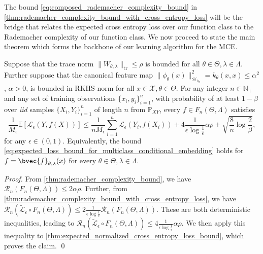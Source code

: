 \documentclass[runningheads, envcountsame, a4paper]{llncs}
\begin{document}
			The bound \eqref{eq:composed_rademacher_complexity_bound} in \cref{thm:rademacher_complexity_bound_with_cross_entropy_loss} will be the bridge that relates the expected cross entropy loss over our function class to the Rademacher complexity of our function class. We now proceed to state the main theorem which forms the backbone of our learning algorithm for the \gls{MCE}.
			
			\begin{lemma}
				\label{thm:expected_loss_bound_for_multiclass_conditional_embedding}
				Suppose that the trace norm $\| W_{\theta, \lambda} \|_{\mathrm{tr}} \leq \rho$ is bounded for all $\theta \in \Theta, \lambda \in \Lambda$. Further suppose that the canonical feature map $\| \phi_{\theta}(x) \|_{\mathcal{H}_{k_{\theta}}}^{2} = k_{\theta}(x, x) \leq \alpha^{2}$, $\alpha > 0$, is bounded in \gls{RKHS} norm for all $x \in \mathcal{X}, \theta \in \Theta$. For any integer $n \in \mathbb{N}_{+}$ and any set of training observations $\{x_{i}, y_{i}\}_{i = 1}^{n}$, with probability of at least $1 - \beta$ over \textit{iid} samples $\{X_{i}, Y_{i}\}_{i = 1}^{n}$ of length $n$ from $\mathbb{P}_{X Y}$, every $f \in F_{n}(\Theta, \Lambda)$ satisfies
				\begin{equation}
					\frac{1}{M_{\epsilon}} \mathbb{E}[\mathcal{L}_{\epsilon}(Y, f(X))] \leq \frac{1}{n M_{\epsilon}} \sum_{i = 1}^{n} \mathcal{L}_{\epsilon}(Y_{i}, f(X_{i})) + 4 \frac{1}{\epsilon \log{\frac{1}{\epsilon}}} \alpha \rho + \sqrt{\frac{8}{n} \log{\frac{2}{\beta}}},
				\label{eq:expected_loss_bound_for_multiclass_conditional_embedding}
				\end{equation}
				for any $\epsilon \in (0, 1)$. Equivalently, the bound \eqref{eq:expected_loss_bound_for_multiclass_conditional_embedding} holds for $f = \bvec{f}_{\theta, \lambda}(x)$ for every $\theta \in \Theta, \lambda \in \Lambda$.
			\end{lemma}
		
			\begin{proof}
				From \cref{thm:rademacher_complexity_bound}, we have $\mathcal{R}_{n}(F_{n}(\Theta, \Lambda)) \leq 2 \alpha \rho$. Further, from \cref{thm:rademacher_complexity_bound_with_cross_entropy_loss}, we have $\mathcal{R}_{n}(\tilde{\mathcal{L}}_{\epsilon} \circ F_{n}(\Theta, \Lambda)) \leq 2 \frac{1}{\epsilon \log{\frac{1}{\epsilon}}} \mathcal{R}_{n}(F_{n}(\Theta, \Lambda))$. These are both deterministic inequalities, leading to $\mathcal{R}_{n}(\tilde{\mathcal{L}}_{\epsilon} \circ F_{n}(\Theta, \Lambda)) \leq 4 \frac{1}{\epsilon \log{\frac{1}{\epsilon}}} \alpha \rho$. We then apply this inequality to \cref{thm:expected_normalized_cross_entropy_loss_bound}, which proves the claim.
				\qed
			\end{proof}
	
\end{document}
